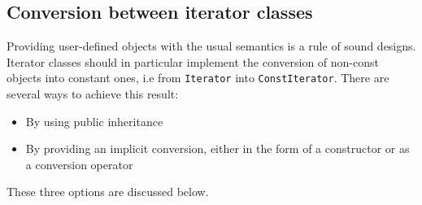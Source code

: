 \subsection{Conversion between iterator classes}
Providing user-defined objects with the usual semantics is a rule of sound designs. Iterator classes should in particular implement the conversion of non-const objects into constant ones, i.e from \lstinline!Iterator! into \lstinline!ConstIterator!. There are several ways to achieve this result:
\begin{itemize}
\item By using public inheritance
\item By providing an implicit conversion, either in the form of a constructor or as a conversion operator
\end{itemize}
These three options are discussed below.

